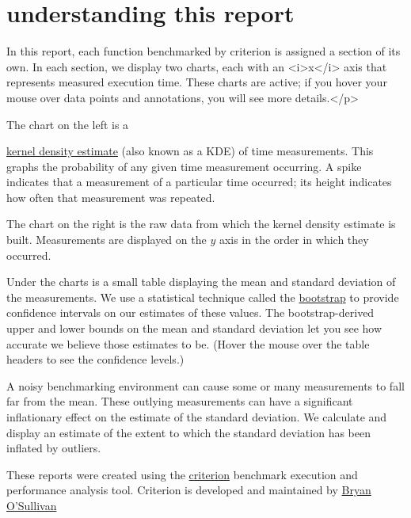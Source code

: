 \section{understanding this report}
In this report, each function benchmarked by criterion is assigned
a section of its own.  In each section, we display two charts, each
with an <i>x</i> axis that represents measured execution time.
These charts are active; if you hover your mouse over data points
and annotations, you will see more details.</p>

The chart on the left is a

\href{http://en.wikipedia.org/wiki/Kernel_density_estimation}{kernel
density estimate} (also known as a KDE) of time
measurements. This graphs the probability of any given time
measurement occurring. A spike indicates that a measurement of a
particular time occurred; its height indicates how often that
measurement was repeated.

The chart on the right is the raw data from which the kernel
density estimate is built.  Measurements are displayed on
the $y$ axis in the order in which they occurred.
   
Under the charts is a small table displaying the mean and standard
deviation of the measurements.  We use a statistical technique
called
the 
\href{http://en.wikipedia.org/wiki/Bootstrapping_(statistics)}{bootstrap}
to provide confidence intervals on our estimates of these values.
The bootstrap-derived upper and lower bounds on the mean and
standard deviation let you see how accurate we believe those
estimates to be. (Hover the mouse over the table headers to see
the confidence levels.)
   
A noisy benchmarking environment can cause some or many
measurements to fall far from the mean. These outlying
measurements can have a significant inflationary effect on the
estimate of the standard deviation. We calculate and display an
estimate of the extent to which the standard deviation has been
inflated by outliers.
   
   
These reports were created using the
\href{http://hackage.haskell.org/package/criterion}{criterion}
benchmark execution and performance analysis tool.
Criterion is developed and maintained
by \href{http://www.serpentine.com/blog/}{Bryan O'Sullivan}

